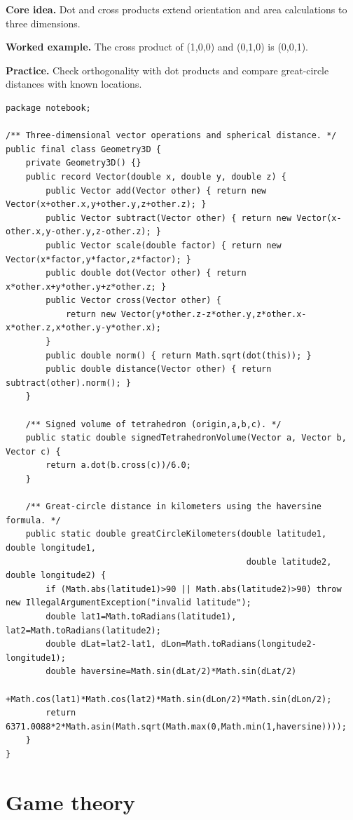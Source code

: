 \documentclass[10pt,letterpaper]{article}
\begin{document}
\noindent\textbf{Core idea.} Dot and cross products extend orientation and area calculations to three dimensions.\par
\noindent\textbf{Worked example.} The cross product of (1,0,0) and (0,1,0) is (0,0,1).\par
\noindent\textbf{Practice.} Check orthogonality with dot products and compare great-circle distances with known locations.\par
\begin{lstlisting}
package notebook;

/** Three-dimensional vector operations and spherical distance. */
public final class Geometry3D {
    private Geometry3D() {}
    public record Vector(double x, double y, double z) {
        public Vector add(Vector other) { return new Vector(x+other.x,y+other.y,z+other.z); }
        public Vector subtract(Vector other) { return new Vector(x-other.x,y-other.y,z-other.z); }
        public Vector scale(double factor) { return new Vector(x*factor,y*factor,z*factor); }
        public double dot(Vector other) { return x*other.x+y*other.y+z*other.z; }
        public Vector cross(Vector other) {
            return new Vector(y*other.z-z*other.y,z*other.x-x*other.z,x*other.y-y*other.x);
        }
        public double norm() { return Math.sqrt(dot(this)); }
        public double distance(Vector other) { return subtract(other).norm(); }
    }

    /** Signed volume of tetrahedron (origin,a,b,c). */
    public static double signedTetrahedronVolume(Vector a, Vector b, Vector c) {
        return a.dot(b.cross(c))/6.0;
    }

    /** Great-circle distance in kilometers using the haversine formula. */
    public static double greatCircleKilometers(double latitude1, double longitude1,
                                                double latitude2, double longitude2) {
        if (Math.abs(latitude1)>90 || Math.abs(latitude2)>90) throw new IllegalArgumentException("invalid latitude");
        double lat1=Math.toRadians(latitude1), lat2=Math.toRadians(latitude2);
        double dLat=lat2-lat1, dLon=Math.toRadians(longitude2-longitude1);
        double haversine=Math.sin(dLat/2)*Math.sin(dLat/2)
                +Math.cos(lat1)*Math.cos(lat2)*Math.sin(dLon/2)*Math.sin(dLon/2);
        return 6371.0088*2*Math.asin(Math.sqrt(Math.max(0,Math.min(1,haversine))));
    }
}
\end{lstlisting}
\section{Game theory}
\end{document}
